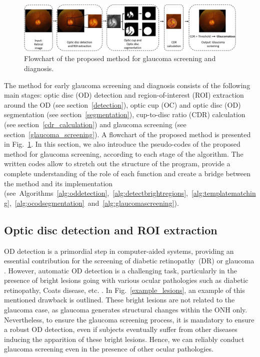 \begin{figure}[h]
	\includegraphics[width=\textwidth]{Images/full-image00.JPG}
	\caption{\label{diagramme}Flowchart of the proposed method for glaucoma screening and diagnosis.}
\end{figure}

The method for early glaucoma screening and diagnosis consists of the following main stages: optic disc (OD) detection and region-of-interest (ROI) extraction around the OD (see \mbox{section \ref{detection}}), optic cup (OC) and optic disc (OD) segmentation (see \mbox{section \ref{segmentation}}), cup-to-disc ratio (CDR) calculation (see \mbox{section \ref{cdr_calculation}}) and glaucoma screening (see \mbox{section \ref{glaucoma_screening}}). A flowchart of the proposed method is presented in \mbox{Fig. \ref{diagramme}}.
In this section, we also introduce the pseudo-codes of the proposed method for glaucoma screening, according to each stage of the algorithm. The written codes allow to stretch out the structure of the program, provide a complete understanding of the role of each function and create a bridge between the method and its implementation (\mbox{see Algorithms~\ref{alg:oddetection}, \ref{alg:detectbrightregions}, \ref{alg:templatematching}, \ref{alg:ocodsegmentation} and \ref{alg:glaucomascreening}).}



\subsection{\label{detection}Optic disc detection and ROI extraction}


OD detection is a primordial step in computer-aided systems, providing an essential contribution for the screening of diabetic \mbox{retinopathy (DR)} or glaucoma \citep{chrastek,dr}. However, automatic OD detection is a challenging task, particularly in the presence of bright lesions going with various ocular pathologies such as diabetic retinopathy, Coats disease, etc. \citep{xiong}. In \mbox{Fig. \ref{example_lesions}}, an example of this mentioned drawback is outlined. These bright lesions are not related to the glaucoma case, as glaucoma generates structural changes within the ONH only. Nevertheless, to ensure the glaucoma screening process, it is mandatory to ensure a robust OD detection, even if subjects eventually suffer from other diseases inducing the apparition of these bright lesions. Hence, we can reliably conduct glaucoma screening even in the presence of other ocular pathologies. 

